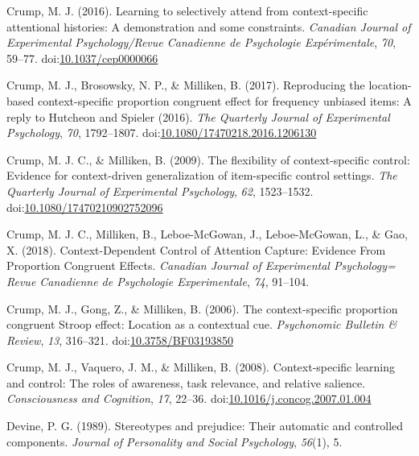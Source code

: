 \documentclass[english,,man,floatsintext]{apa6}
\begin{document}
\leavevmode\hypertarget{ref-crump_learning_2016}{}%
Crump, M. J. (2016). Learning to selectively attend from context-specific attentional histories: A demonstration and some constraints. \emph{Canadian Journal of Experimental Psychology/Revue Canadienne de Psychologie Expérimentale}, \emph{70}, 59--77. doi:\href{https://doi.org/10.1037/cep0000066}{10.1037/cep0000066}

\leavevmode\hypertarget{ref-crump_reproducing_2017}{}%
Crump, M. J., Brosowsky, N. P., \& Milliken, B. (2017). Reproducing the location-based context-specific proportion congruent effect for frequency unbiased items: A reply to Hutcheon and Spieler (2016). \emph{The Quarterly Journal of Experimental Psychology}, \emph{70}, 1792--1807. doi:\href{https://doi.org/10.1080/17470218.2016.1206130}{10.1080/17470218.2016.1206130}

\leavevmode\hypertarget{ref-crump_flexibility_2009}{}%
Crump, M. J. C., \& Milliken, B. (2009). The flexibility of context-specific control: Evidence for context-driven generalization of item-specific control settings. \emph{The Quarterly Journal of Experimental Psychology}, \emph{62}, 1523--1532. doi:\href{https://doi.org/10.1080/17470210902752096}{10.1080/17470210902752096}

\leavevmode\hypertarget{ref-crump_context-dependent_2018}{}%
Crump, M. J. C., Milliken, B., Leboe-McGowan, J., Leboe-McGowan, L., \& Gao, X. (2018). Context-Dependent Control of Attention Capture: Evidence From Proportion Congruent Effects. \emph{Canadian Journal of Experimental Psychology= Revue Canadienne de Psychologie Experimentale}, \emph{74}, 91--104.

\leavevmode\hypertarget{ref-crump_context-specific_2006}{}%
Crump, M. J., Gong, Z., \& Milliken, B. (2006). The context-specific proportion congruent Stroop effect: Location as a contextual cue. \emph{Psychonomic Bulletin \& Review}, \emph{13}, 316--321. doi:\href{https://doi.org/10.3758/BF03193850}{10.3758/BF03193850}

\leavevmode\hypertarget{ref-crump_context-specific_2008}{}%
Crump, M. J., Vaquero, J. M., \& Milliken, B. (2008). Context-specific learning and control: The roles of awareness, task relevance, and relative salience. \emph{Consciousness and Cognition}, \emph{17}, 22--36. doi:\href{https://doi.org/10.1016/j.concog.2007.01.004}{10.1016/j.concog.2007.01.004}

\leavevmode\hypertarget{ref-devine_stereotypes_1989}{}%
Devine, P. G. (1989). Stereotypes and prejudice: Their automatic and controlled components. \emph{Journal of Personality and Social Psychology}, \emph{56}(1), 5.
\end{document}
